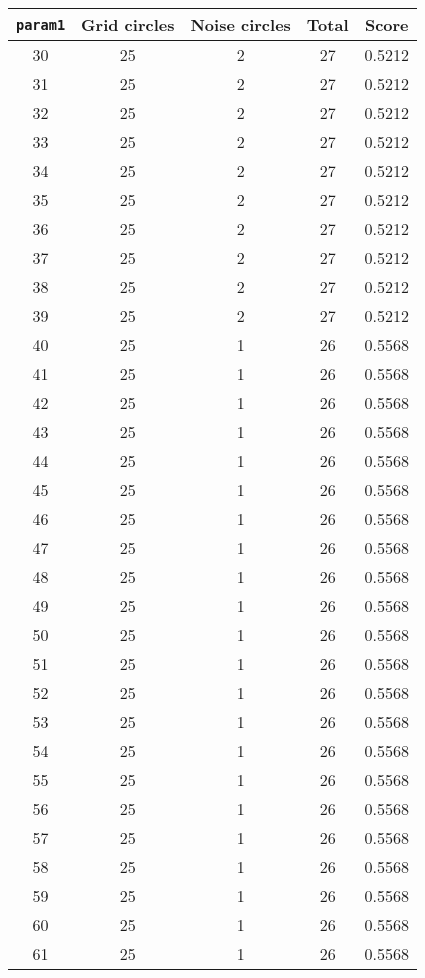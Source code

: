 \documentclass[letterpaper, 12pt]{article}
\begin{document}
\begin{longtable}{|c|c|c|c|c|}
\hline
\textbf{\texttt{param1}} & \textbf{Grid circles} & \textbf{Noise circles} & \textbf{Total} & \textbf{Score} \\
\hline
30 & 25 & 2 & 27 & 0.5212 \\
\hline
31 & 25 & 2 & 27 & 0.5212 \\
\hline
32 & 25 & 2 & 27 & 0.5212 \\
\hline
33 & 25 & 2 & 27 & 0.5212 \\
\hline
34 & 25 & 2 & 27 & 0.5212 \\
\hline
35 & 25 & 2 & 27 & 0.5212 \\
\hline
36 & 25 & 2 & 27 & 0.5212 \\
\hline
37 & 25 & 2 & 27 & 0.5212 \\
\hline
38 & 25 & 2 & 27 & 0.5212 \\
\hline
39 & 25 & 2 & 27 & 0.5212 \\
\hline
40 & 25 & 1 & 26 & 0.5568 \\
\hline
41 & 25 & 1 & 26 & 0.5568 \\
\hline
42 & 25 & 1 & 26 & 0.5568 \\
\hline
43 & 25 & 1 & 26 & 0.5568 \\
\hline
44 & 25 & 1 & 26 & 0.5568 \\
\hline
45 & 25 & 1 & 26 & 0.5568 \\
\hline
46 & 25 & 1 & 26 & 0.5568 \\
\hline
47 & 25 & 1 & 26 & 0.5568 \\
\hline
48 & 25 & 1 & 26 & 0.5568 \\
\hline
49 & 25 & 1 & 26 & 0.5568 \\
\hline
50 & 25 & 1 & 26 & 0.5568 \\
\hline
51 & 25 & 1 & 26 & 0.5568 \\
\hline
52 & 25 & 1 & 26 & 0.5568 \\
\hline
53 & 25 & 1 & 26 & 0.5568 \\
\hline
54 & 25 & 1 & 26 & 0.5568 \\
\hline
55 & 25 & 1 & 26 & 0.5568 \\
\hline
56 & 25 & 1 & 26 & 0.5568 \\
\hline
57 & 25 & 1 & 26 & 0.5568 \\
\hline
58 & 25 & 1 & 26 & 0.5568 \\
\hline
59 & 25 & 1 & 26 & 0.5568 \\
\hline
60 & 25 & 1 & 26 & 0.5568 \\
\hline
61 & 25 & 1 & 26 & 0.5568 \\

\end{longtable}
\end{document}
